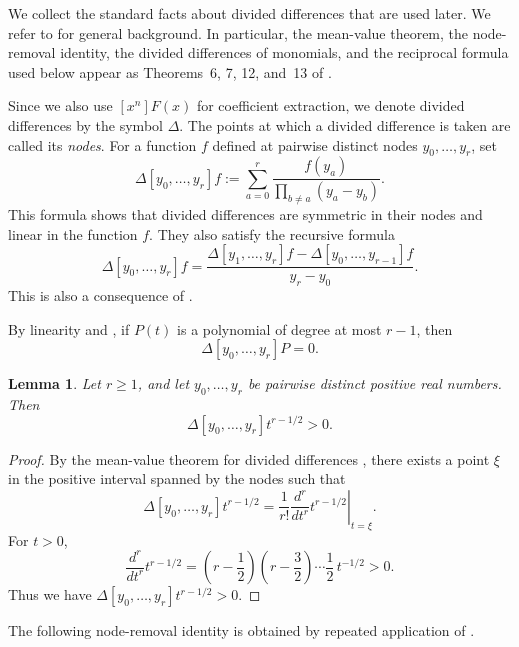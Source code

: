 \documentclass[10pt,a4paper]{amsart}
\newtheorem{Lemma}[Theorem]{Lemma}
\theoremstyle{definition}
\newcommand{\DD}{\Delta}
\begin{document}
We collect the standard facts about divided differences that are used later.
We refer to \cite{deBoorDividedDifferences,DubeauHermite} for general
background.  In particular, the mean-value theorem, the node-removal
identity, the divided differences of monomials, and the reciprocal formula
used below appear as Theorems~6, 7, 12, and~13 of \cite{DubeauHermite}.

Since we also use $[x^n]F(x)$ for coefficient extraction, we denote divided
differences by the symbol $\DD$.  The points at which a divided difference is
taken are called its \emph{nodes}.  For a function $f$ defined at pairwise
distinct nodes $y_0,\ldots,y_r$, set
\begin{equation} \label{didi_def}
    \DD[y_0,\ldots,y_r]f
:=
\sum_{a=0}^r
\frac{f(y_a)}{\prod_{b\ne a}(y_a-y_b)}.
\end{equation}
This formula shows that divided differences are symmetric in their nodes and
linear in the function $f$.  They also satisfy the recursive formula
\begin{equation} \label{didi_rec}
\DD[y_0,\ldots,y_r]f
=
\frac{
\DD[y_1,\ldots,y_r]f-
\DD[y_0,\ldots,y_{r-1}]f
}{y_r-y_0}.
\end{equation}
This is also a consequence of \cite[Theorem~7]{DubeauHermite}.

By linearity and \cite[Theorem~12(i)]{DubeauHermite}, if $P(t)$ is a
polynomial of degree at most $r-1$, then
\begin{equation}\label{didi_deg}
\DD[y_0,\ldots,y_r]P=0.
\end{equation}

\begin{Lemma}\label{lem:power-dd-positive}
Let $r\ge1$, and let $y_0,\ldots,y_r$ be pairwise distinct positive real
numbers.  Then
\[
\DD[y_0,\ldots,y_r]t^{r-1/2}>0.
\]
\end{Lemma}

\begin{proof}
By the mean-value theorem for divided differences
\cite[Theorem~6]{DubeauHermite}, there exists a point $\xi$ in the positive
interval spanned by the nodes such that
\[
\DD[y_0,\ldots,y_r]t^{r-1/2}
=
\frac1{r!}
\left.\frac{d^r}{dt^r}t^{r-1/2}\right|_{t=\xi}.
\]
For $t>0$,
\[
\frac{d^r}{dt^r}t^{r-1/2}
=
\left(r-\frac12\right)
\left(r-\frac32\right)\cdots\frac12\,t^{-1/2}>0.
\]
Thus we have $\DD[y_0,\ldots,y_r]t^{r-1/2}>0$.
\end{proof}

The following node-removal identity is obtained by repeated application of
\cite[Theorem~7]{DubeauHermite}.
\end{document}
